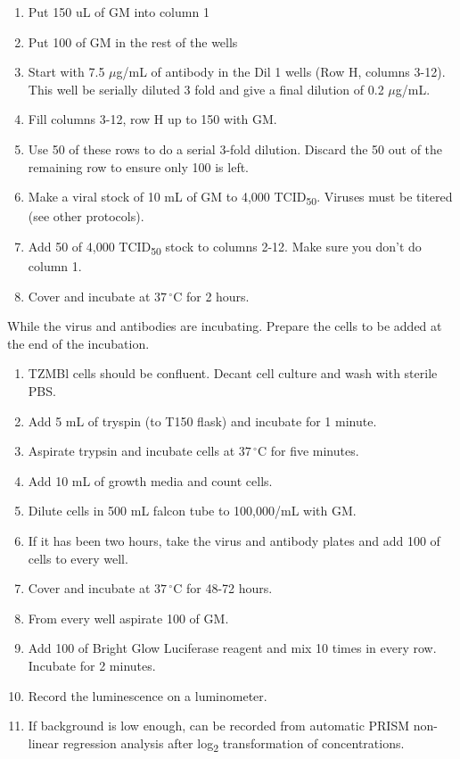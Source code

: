 \begin{enumerate}
  \item Put 150 uL of GM into column 1
  \item Put 100 \microliter of GM in the rest of the wells
  \item Start with 7.5 $\mu$g/mL of antibody in the Dil 1 wells (Row H, columns 3-12). This well be serially diluted 3 fold and give a final dilution of 0.2 $\mu$g/mL.
  \item Fill columns 3-12, row H up to 150 \microliter with GM.
  \item Use 50 \microliter of these rows to do a serial 3-fold dilution. Discard the 50 \microliter out of the remaining row to ensure only 100 \microliter is left.
  \item Make a viral stock of 10 mL of GM to 4,000 TCID\textsubscript{50}. Viruses must be titered (see other protocols).
  \item Add 50 \microliter of 4,000 TCID\textsubscript{50} stock to columns 2-12. Make sure you don't do column 1.
  \item Cover and incubate at $37\,^{\circ}\mathrm{C}$ for 2 hours.
\end{enumerate}

While the virus and antibodies are incubating. Prepare the cells to be added at the end of the incubation.

\begin{enumerate}
  \item TZMBl cells should be confluent. Decant cell culture and wash with sterile PBS.
  \item Add 5 mL of tryspin (to T150 flask) and incubate for 1 minute.
  \item Aspirate trypsin and incubate cells at $37\,^{\circ}\mathrm{C}$ for five minutes.
  \item Add 10 mL of growth media and count cells.
  \item Dilute cells in 500 mL falcon tube to 100,000/mL with GM.
  \item If it has been two hours, take the virus and antibody plates and add 100 \microliter of cells to every well.
  \item Cover and incubate at $37\,^{\circ}\mathrm{C}$ for 48-72 hours.
  \item From every well aspirate 100 \microliter of GM.
  \item Add 100 \microliter of Bright Glow Luciferase reagent and mix 10 times in every row. Incubate for 2 minutes.
  \item Record the luminescence on a luminometer.
  \item If background is low enough, \ic can be recorded from automatic PRISM non-linear regression analysis after log\textsubscript{2} transformation of concentrations.
\end{enumerate}



\clearpage